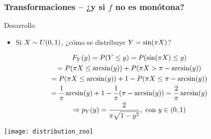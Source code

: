 \documentclass[table]{beamer}
\begin{document}
\begin{frame}
    \frametitle{Transformaciones -- ¿y si $f$ no es monótona?}
    \begin{block}{Desarrollo}
        \begin{itemize}
            \item Si $X \sim \uniform{0}{1}$, ¿cómo se distribuye $Y = \sin \parens{\pi X}$?
        \end{itemize}
        \begin{multline*}
            \pFF{Y}{y} = \prob{Y \leq y}
            = \prob{\sin \parens{\pi X} \leq y}
            \\
            = \prob{\pi X \leq \arcsin \parens{y}} + \prob{\pi X > \pi - \arcsin \parens{y}}
            \\
            = \prob{\pi X \leq \arcsin \parens{y}} + 1 - \prob{\pi X \leq \pi - \arcsin \parens{y}}
            \\
            = \frac{1}{\pi} \arcsin \parens{y} + 1 - \frac{1}{\pi} \parens{\pi - \arcsin \parens{y}}
            = \frac{2}{\pi} \arcsin \parens{y}
            \\
            \Rightarrow
            \ppdf{Y}{y} = \frac{2}{\pi \sqrt{1 - y^{2}}} , \text{ con } y \in \parens{0 , 1}
        \end{multline*}
    \end{block}
    \begin{center}
    \end{center}
\end{frame}

\begin{frame}
    \begin{center}
        \texttt{[image: distribution\_zoo]}
    \end{center}
\end{frame}
\end{document}
